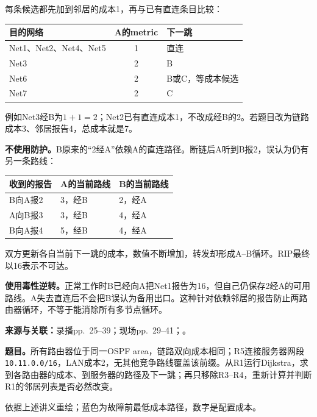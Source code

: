\begin{workedsolution}
每条候选都先加到邻居的成本1，再与已有直连条目比较：
\begin{center}
\small
\begin{tabular}{@{}lcl@{}}
\toprule
目的网络 & A的metric & 下一跳 \\
\midrule
Net1、Net2、Net4、Net5 & 1 & 直连 \\
Net3 & 2 & B \\
Net6 & 2 & B或C，等成本候选 \\
Net7 & 2 & C \\
\bottomrule
\end{tabular}
\end{center}
例如Net3经B为$1+1=2$；Net2已有直连成本1，不改成经B的2。若题目改为链路成本3、邻居报告4，总成本就是7。

\textbf{不使用防护。}B原来的“2经A”依赖A的直连路径。断链后A听到B报2，误认为仍有另一条路线：
\begin{center}
\small
\begin{tabular}{@{}lll@{}}
\toprule
收到的报告 & A的当前路线 & B的当前路线 \\
\midrule
B向A报2 & 3，经B & 2，经A \\
A向B报3 & 3，经B & 4，经A \\
B向A报4 & 5，经B & 4，经A \\
\bottomrule
\end{tabular}
\end{center}
双方更新各自当前下一跳的成本，数值不断增加，转发却形成A--B循环。RIP最终以16表示不可达。

\textbf{使用毒性逆转。}正常工作时B已经向A把Net1报告为16，但自己仍保存2经A的可用路线。A失去直连后不会把B误认为备用出口。这种针对依赖邻居的报告防止两路由器循环，不等于能消除所有多节点循环。
\end{workedsolution}


\textbf{来源与关联：}录播pp.~25--39；现场pp.~29--41；。

\textbf{题目。}所有路由器位于同一OSPF area，链路双向成本相同；R5连接服务器网段\texttt{10.11.0.0/16}，LAN成本2，无其他竞争路线覆盖该前缀。从R1运行Dijkstra，求到各路由器的成本、到服务器的路径及下一跳；再只移除R3--R4，重新计算并判断R1的邻居列表是否必然改变。

\begin{center}


\small 依据上述讲义重绘；蓝色为故障前最低成本路径，数字是配置成本。
\end{center}

